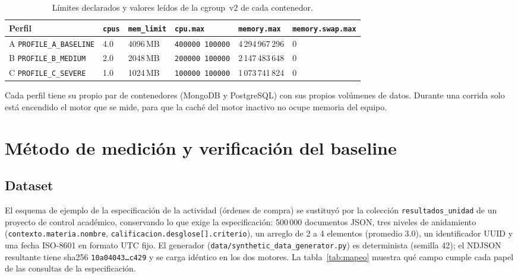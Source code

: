 \documentclass[11pt,letterpaper]{article}
\begin{document}
\begin{table}[H]\centering\small
\caption{Límites declarados y valores leídos de la cgroup~v2 de cada contenedor.}
\label{tab:limites}
\begin{tabular}{llllll}
\toprule
Perfil & \texttt{cpus} & \texttt{mem\_limit} & \texttt{cpu.max} & \texttt{memory.max} & \texttt{memory.swap.max} \\
\midrule
A \texttt{PROFILE\_A\_BASELINE} & 4.0 & 4096\,MB & \texttt{400000 100000} & 4\,294\,967\,296 & 0 \\
B \texttt{PROFILE\_B\_MEDIUM}   & 2.0 & 2048\,MB & \texttt{200000 100000} & 2\,147\,483\,648 & 0 \\
C \texttt{PROFILE\_C\_SEVERE}   & 1.0 & 1024\,MB & \texttt{100000 100000} & 1\,073\,741\,824 & 0 \\
\bottomrule
\end{tabular}
\end{table}

\noindent Cada perfil tiene su propio par de contenedores (MongoDB y PostgreSQL) con sus
propios volúmenes de datos. Durante una corrida solo está encendido el motor que se mide, para que
la caché del motor inactivo no ocupe memoria del equipo.

\section{Método de medición y verificación del baseline}
\label{sec:metodo}

\subsection{Dataset}
El esquema de ejemplo de la especificación de la actividad (órdenes de compra) se sustituyó por la colección
\texttt{resultados\_unidad} de un proyecto de control académico, conservando lo que
exige la especificación: 500\,000 documentos JSON, tres niveles de anidamiento
(\texttt{contexto.materia.nombre}, \texttt{calificacion.desglose[].criterio}), un arreglo de
2 a 4 elementos (promedio 3.0), un identificador UUID y una fecha ISO-8601 en formato UTC fijo.
El generador (\texttt{data/synthetic\_data\_generator.py}) es determinista (semilla 42); el
NDJSON resultante tiene sha256 \texttt{10a04043\ldots c429} y se carga idéntico en los dos motores.
La tabla~\ref{tab:mapeo} muestra qué campo cumple cada papel de las consultas de la
especificación.
\end{document}
